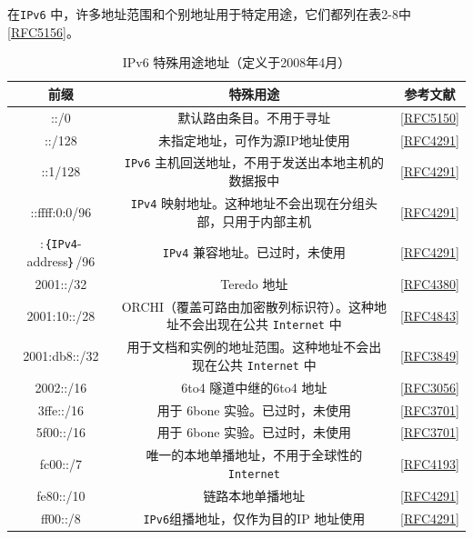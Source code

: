 在\verb|IPv6| 中，许多地址范围和个别地址用于特定用途，它们都列在表2-8中\href{https://www.rfc-editor.org/rfc/rfc5156}{[RFC5156]}。

\begin{table}[]
    \centering
    \caption{IPv6 特殊用途地址（定义于2008年4月）}
    \begin{tabular}{c|c|c}
        \hline
        前缀	&	特殊用途	&	参考文献  \\ \hline
        ::/0	&	默认路由条目。不用于寻址	&	\href{https://www.rfc-editor.org/rfc/rfc5150}{[RFC5150]}  \\ \hline
        ::/128	&	未指定地址，可作为源IP地址使用	&	\href{https://www.rfc-editor.org/rfc/rfc4291}{[RFC4291]}  \\ \hline
        ::1/128	&	\verb|IPv6| 主机回送地址，不用于发送出本地主机的数据报中	&	\href{https://www.rfc-editor.org/rfc/rfc4291}{[RFC4291]}  \\ \hline
        ::ffff:0:0/96	&	\verb|IPv4| 映射地址。这种地址不会出现在分组头部，只用于内部主机	&	\href{https://www.rfc-editor.org/rfc/rfc4291}{[RFC4291]}  \\ \hline
        :｛\verb|IPv4|-address｝/96	&	\verb|IPv4| 兼容地址。已过时，未使用	&	\href{https://www.rfc-editor.org/rfc/rfc4291}{[RFC4291]}  \\ \hline
        2001::/32	&	Teredo 地址	&	\href{https://www.rfc-editor.org/rfc/rfc4380}{[RFC4380]}  \\ \hline
        2001:10::/28	&	ORCHI（覆盖可路由加密散列标识符）。这种地址不会出现在公共 \verb|Internet| 中	&	\href{https://www.rfc-editor.org/rfc/rfc4843}{[RFC4843]}  \\ \hline
        2001:db8::/32	&	用于文档和实例的地址范围。这种地址不会出现在公共 \verb|Internet| 中	&	\href{https://www.rfc-editor.org/rfc/rfc3849}{[RFC3849]}  \\ \hline
        2002::/16	&	6to4 隧道中继的6to4 地址	&	\href{https://www.rfc-editor.org/rfc/rfc3056}{[RFC3056]}  \\ \hline
        3ffe::/16	&	用于 6bone 实验。已过时，未使用	&	\href{https://www.rfc-editor.org/rfc/rfc3701}{[RFC3701]}  \\ \hline
        5f00::/16	&	用于 6bone 实验。已过时，未使用	&	\href{https://www.rfc-editor.org/rfc/rfc3701}{[RFC3701]}  \\ \hline
        fc00::/7	&	唯一的本地单播地址，不用于全球性的 \verb|Internet|	&	\href{https://www.rfc-editor.org/rfc/rfc4193}{[RFC4193]}  \\ \hline
        fe80::/10	&	链路本地单播地址	&	\href{https://www.rfc-editor.org/rfc/rfc4291}{[RFC4291]}  \\ \hline
        ff00::/8	&	\verb|IPv6|组播地址，仅作为目的IP 地址使用	&	\href{https://www.rfc-editor.org/rfc/rfc4291}{[RFC4291]}  \\ \hline
    \end{tabular}
\end{table}

